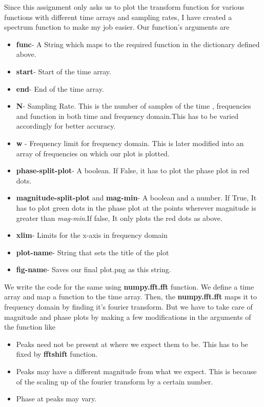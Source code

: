 \documentclass[12pt, a4paper]{report}
\begin{document}
Since this assignment only asks us to plot the transform function for various functions with different time arrays and sampling rates, I have created a spectrum function to make my job easier. Our function's arguments are
\begin{itemize}
	\item \textbf{func}- A String which maps to the required function in the dictionary defined above.
	\item \textbf{start}- Start of the time array.
	\item \textbf{end}- End of the time array.
	\item \textbf{N}- Sampling Rate. This is the number of samples of the time , frequencies and  function in both time and frequency domain.This has to be varied accordingly for better accuracy.
	\item \textbf{w} - Frequency limit for frequency domain. This is later modified into an array of frequencies on which our plot is plotted.
	\item \textbf{phase-split-plot}- A boolean. If False, it has to plot the phase plot in red dots.
	\item \textbf{magnitude-split-plot} and \textbf{mag-min}- A boolean and a number. If True, It has to plot green dots in the phase plot at the points wherever magnitude is greater than \textit{mag-min}.If false, It only plots the red dots as above.
	\item \textbf{xlim}- Limits for the x-axis in frequency domain
	\item \textbf{plot-name}- String that sets the title of the plot
	\item \textbf{fig-name}- Saves our final plot.png as this string.
\end{itemize}

We write the code for the same using \textbf{numpy.fft.fft} function. We define a time array and map a function to the time array. Then, the \textbf{numpy.fft.fft} maps it to frequency domain by finding it's fourier transform. But we have to take care of magnitude and phase plots by making a few modifications in the arguments of the function like
\begin{itemize}
	\item Peaks need not be present at where we expect them to be. This has to be fixed by \textbf{fftshift} function.
	\item Peaks may have a different magnitude from what we expect. This is because of the scaling up of the fourier transform by a certain number.
	\item Phase at peaks may vary.
\end{itemize}
\end{document}
